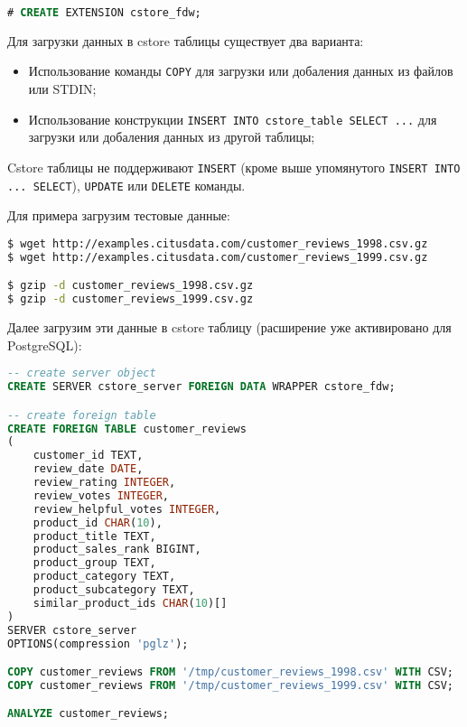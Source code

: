 \begin{lstlisting}[language=SQL,label=lst:cstore2,caption=Cstore\_fdw]
# CREATE EXTENSION cstore_fdw;
\end{lstlisting}

Для загрузки данных в cstore таблицы существует два варианта:

\begin{itemize}
  \item Использование команды \lstinline!COPY! для загрузки или добаления данных из файлов или STDIN;
  \item Использование конструкции \lstinline!INSERT INTO cstore_table SELECT ...! для загрузки или добаления данных из другой таблицы;
\end{itemize}

Cstore таблицы не поддерживают \lstinline!INSERT! (кроме выше упомянутого \lstinline!INSERT INTO ... SELECT!), \lstinline!UPDATE! или \lstinline!DELETE! команды.

Для примера загрузим тестовые данные:

\begin{lstlisting}[language=Bash,label=lst:cstore3,caption=Cstore\_fdw]
$ wget http://examples.citusdata.com/customer_reviews_1998.csv.gz
$ wget http://examples.citusdata.com/customer_reviews_1999.csv.gz

$ gzip -d customer_reviews_1998.csv.gz
$ gzip -d customer_reviews_1999.csv.gz
\end{lstlisting}

Далее загрузим эти данные в cstore таблицу (расширение уже активировано для PostgreSQL):

\begin{lstlisting}[language=SQL,label=lst:cstore4,caption=Cstore таблицы]
-- create server object
CREATE SERVER cstore_server FOREIGN DATA WRAPPER cstore_fdw;

-- create foreign table
CREATE FOREIGN TABLE customer_reviews
(
    customer_id TEXT,
    review_date DATE,
    review_rating INTEGER,
    review_votes INTEGER,
    review_helpful_votes INTEGER,
    product_id CHAR(10),
    product_title TEXT,
    product_sales_rank BIGINT,
    product_group TEXT,
    product_category TEXT,
    product_subcategory TEXT,
    similar_product_ids CHAR(10)[]
)
SERVER cstore_server
OPTIONS(compression 'pglz');

COPY customer_reviews FROM '/tmp/customer_reviews_1998.csv' WITH CSV;
COPY customer_reviews FROM '/tmp/customer_reviews_1999.csv' WITH CSV;

ANALYZE customer_reviews;
\end{lstlisting}

